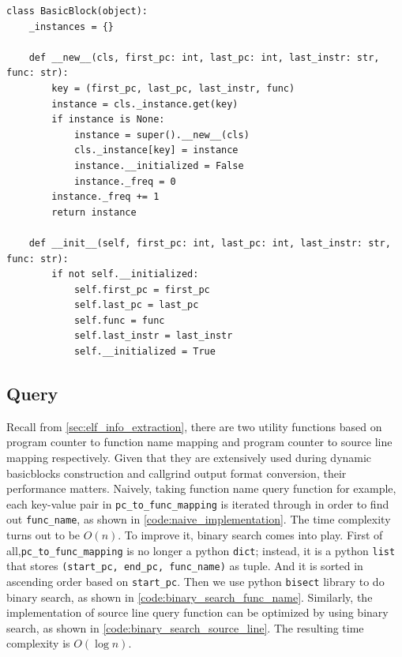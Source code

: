 \medskip
\begin{center}
\begin{minipage}{\textwidth}
\begin{lstlisting}
class BasicBlock(object):
    _instances = {}

    def __new__(cls, first_pc: int, last_pc: int, last_instr: str, func: str):
        key = (first_pc, last_pc, last_instr, func)
        instance = cls._instance.get(key)
        if instance is None:
            instance = super().__new__(cls)
            cls._instance[key] = instance
            instance.__initialized = False
            instance._freq = 0
        instance._freq += 1
        return instance

    def __init__(self, first_pc: int, last_pc: int, last_instr: str, func: str):
        if not self.__initialized:
            self.first_pc = first_pc
            self.last_pc = last_pc
            self.func = func
            self.last_instr = last_instr
            self.__initialized = True

\end{lstlisting}
\end{minipage}
\end{center}


\subsection{Query}
Recall from \cref{sec:elf_info_extraction}, there are two utility functions based on program counter to function name mapping and program counter to source line mapping respectively. Given that they are extensively used during dynamic basicblocks construction and callgrind output format conversion, their performance matters. Naively, taking function name query function for example, each key-value pair in \texttt{pc\_to\_func\_mapping} is iterated through in order to find out \texttt{func\_name}, as shown in \cref{code:naive_implementation}. The time complexity turns out to be \( O(n) \). To improve it, binary search comes into play. First of all,\texttt{pc\_to\_func\_mapping} is no longer a python \texttt{dict}; instead, it is a python \texttt{list} that stores \texttt{(start\_pc, end\_pc, func\_name)} as tuple. And it is sorted in ascending order based on \texttt{start\_pc}. Then we use python \texttt{bisect} library to do binary search, as shown in \cref{code:binary_search_func_name}. Similarly, the implementation of source line query function can be optimized by using binary search, as shown in \cref{code:binary_search_source_line}. The resulting time complexity is \( O(\log n) \).

